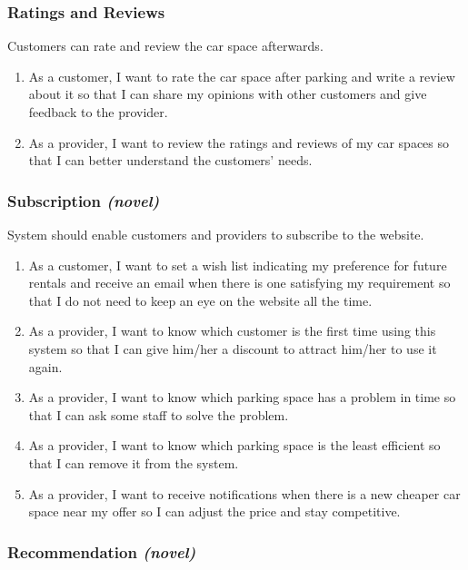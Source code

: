 \documentclass[12pt]{article}
\begin{document}
\subsubsection{Ratings and Reviews}

Customers can rate and review the car space afterwards.

\begin{enumerate}[resume]
  \item As a customer, I want to rate the car space after parking and write a review about it so that I can share my opinions with other customers and give feedback to the provider.
  \item As a provider, I want to review the ratings and reviews of my car spaces so that I can better understand the customers' needs.
\end{enumerate}

\subsubsection{Subscription \textit{(novel)}}

System should enable customers and providers to subscribe to the website.

\begin{enumerate}[resume]
  \item As a customer, I want to set a wish list indicating my preference for future rentals and receive an email when there is one satisfying my requirement so that I do not need to keep an eye on the website all the time.
  \item As a provider, I want to know which customer is the first time using this system so that I can give him/her a discount to attract him/her to use it again.
  \item As a provider, I want to know which parking space has a problem in time so that I can ask some staff to solve the problem.
  \item As a provider, I want to know which parking space is the least efficient so that I can remove it from the system.
  \item As a provider, I want to receive notifications when there is a new cheaper car space near my offer so I can adjust the price and stay competitive.
\end{enumerate}

\subsubsection{Recommendation \textit{(novel)}}
\end{document}
